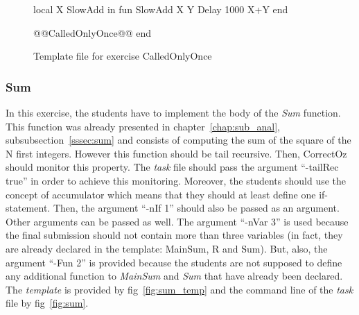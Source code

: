 \documentclass[11pt,a4paper,twoside,openright]{report}
\begin{document}
\begin{figure}[!ht]
 \begin{OZ}
  local X SlowAdd in
    fun {SlowAdd X Y}
      {Delay 1000}
      X+Y
    end
      
    @@CalledOnlyOnce@@
  end
\end{OZ}
 \caption{Template file for exercise CalledOnlyOnce}
 \label{fig:calledonce_temp}
\end{figure}


\subsubsection{Sum}
In this exercise, the students have to implement the body of the \textit{Sum} 
function. This function was already presented in chapter~\ref{chap:sub_anal}, 
subsubsection~\ref{sssec:sum} and consists of computing the sum of the square of 
the N first integers. However this function should be tail recursive. Then, CorrectOz 
should monitor this property. The \textit{task} file should pass 
the argument \enquote{-tailRec true} in order to achieve this monitoring. 
Moreover, the students should use the concept of accumulator which means that 
they should at least define one if-statement. Then, the argument \enquote{-nIf 
1} should also be passed as an argument. Other arguments can be passed as well. 
The argument \enquote{-nVar 3} is used because the final submission should not contain more than 
three variables (in fact, they are already declared in the template: MainSum, R 
and Sum). But, also, the argument \enquote{-Fun 2} is provided because 
the students are not supposed to 
define any additional function to \textit{MainSum} and \textit{Sum} that have 
already been declared. The \textit{template} is provided by 
fig~\ref{fig:sum_temp} and the command line of the \textit{task} file by 
fig~\ref{fig:sum}.
\end{document}
